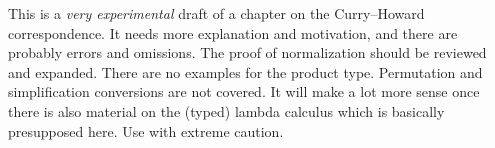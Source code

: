 \documentclass[../../../include/open-logic-chapter]{subfiles}
\begin{document}

\begin{editorial}
  This is a \emph{very experimental} draft of a chapter on the
  Curry--Howard correspondence.  It needs more explanation and
  motivation, and there are probably errors and omissions. The proof
  of normalization should be reviewed and expanded. There are no
  examples for the product type. Permutation and simplification
  conversions are not covered. It will make a lot more sense once
  there is also material on the (typed) lambda calculus which is
  basically presupposed here. Use with extreme caution.
\end{editorial}








\OLEndChapterHook
\end{document}
